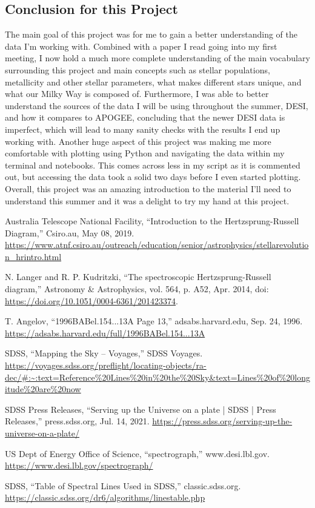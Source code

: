 \documentclass{article}
\begin{document}
\subsection*{Conclusion for this Project}
\indent The main goal of this project was for me to gain a better understanding of the data I’m working with. Combined with a paper I read going into my first meeting, I now hold a much more complete understanding of the main vocabulary surrounding this project and main concepts such as stellar populations, metallicity and other stellar parameters, what makes different stars unique, and what our Milky Way is composed of. Furthermore, I was able to better understand the sources of the data I will be using throughout the summer, DESI, and how it compares to APOGEE, concluding that the newer DESI data is imperfect, which will lead to many sanity checks with the results I end up working with. Another huge aspect of this project was making me more comfortable with plotting using Python and navigating the data within my terminal and notebooks. This comes across less in my script as it is commented out, but accessing the data took a solid two days before I even started plotting. Overall, this project was an amazing introduction to the material I’ll need to understand this summer and it was a delight to try my hand at this project.

\newpage

\begin{thebibliography}{99}
    
Australia Telescope National Facility, “Introduction to the Hertzsprung-Russell Diagram,” Csiro.au, May 08, 2019. \url{https://www.atnf.csiro.au/outreach/education/senior/astrophysics/stellarevolution_hrintro.html}

N. Langer and R. P. Kudritzki, “The spectroscopic Hertzsprung-Russell diagram,” Astronomy \& Astrophysics, vol. 564, p. A52, Apr. 2014, doi: \url{https://doi.org/10.1051/0004-6361/201423374}.

T. Angelov, “1996BABel.154...13A Page 13,” adsabs.harvard.edu, Sep. 24, 1996. \url{https://adsabs.harvard.edu/full/1996BABel.154...13A}

SDSS, “Mapping the Sky – Voyages,” SDSS Voyages. \url{https://voyages.sdss.org/preflight/locating-objects/ra-dec/#:~:text=Reference%20Lines%20in%20the%20Sky&text=Lines%20of%20longitude%20are%20now}

SDSS Press Releases, “Serving up the Universe on a plate | SDSS | Press Releases,” press.sdss.org, Jul. 14, 2021. \url{https://press.sdss.org/serving-up-the-universe-on-a-plate/}

US Dept of Energy Office of Science, “spectrograph,” www.desi.lbl.gov. \url{https://www.desi.lbl.gov/spectrograph/}

SDSS, “Table of Spectral Lines Used in SDSS,” classic.sdss.org. \url{https://classic.sdss.org/dr6/algorithms/linestable.php}

\end{thebibliography}
\end{document}
